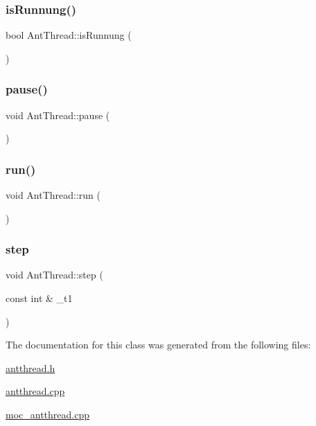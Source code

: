 \mbox{\label{classAntThread_ae2f0439c6840a4fd390d095b2c8f0390}} 
\subsubsection{\texorpdfstring{is\+Runnung()}{isRunnung()}}
{\footnotesize\ttfamily bool Ant\+Thread\+::is\+Runnung (\begin{DoxyParamCaption}{ }\end{DoxyParamCaption})\hspace{0.3cm}{\ttfamily [inline]}}

\mbox{\label{classAntThread_a1aee3c02ee018bfed2a7ab48f3b67733}} 
\subsubsection{\texorpdfstring{pause()}{pause()}}
{\footnotesize\ttfamily void Ant\+Thread\+::pause (\begin{DoxyParamCaption}{ }\end{DoxyParamCaption})\hspace{0.3cm}{\ttfamily [inline]}}

\mbox{\label{classAntThread_afe195ea6447effd27d04af6777e33b2d}} 
\subsubsection{\texorpdfstring{run()}{run()}}
{\footnotesize\ttfamily void Ant\+Thread\+::run (\begin{DoxyParamCaption}{ }\end{DoxyParamCaption})}

\mbox{\label{classAntThread_a47a99b29c58316af5d299c088456917e}} 
\subsubsection{\texorpdfstring{step}{step}}
{\footnotesize\ttfamily void Ant\+Thread\+::step (\begin{DoxyParamCaption}\item[{const int \&}]{\+\_\+t1 }\end{DoxyParamCaption})\hspace{0.3cm}{\ttfamily [signal]}}



The documentation for this class was generated from the following files\+:\begin{DoxyCompactItemize}
\item 
\hyperlink{antthread_8h}{antthread.\+h}\item 
\hyperlink{antthread_8cpp}{antthread.\+cpp}\item 
\hyperlink{moc__antthread_8cpp}{moc\+\_\+antthread.\+cpp}\end{DoxyCompactItemize}
